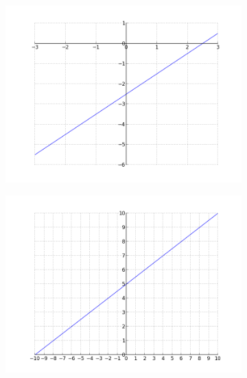 \documentclass[12pt,twoside,onecolumn]{article}
\begin{document}
\begin{Exercise}
\begin{figure}[h!]
\begin{subfigure}{.5\textwidth}
    \includegraphics[scale = 0.5]{figures/Xm25.png}
    \end{subfigure}%
    \begin{subfigure}{.5\textwidth}
    \centering
    \includegraphics[scale = 0.5]{figures/05Xp5.png}
    \end{subfigure}
\end{figure}


\end{Exercise}
\end{document}

